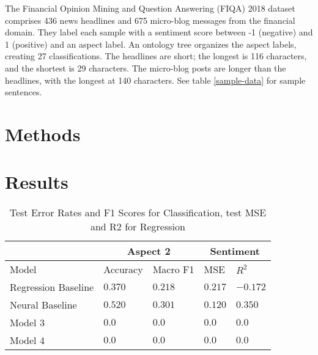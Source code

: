 \documentclass[11pt,a4paper,titlepage]{article}
\begin{document}
The Financial Opinion Mining and Question Answering (FIQA) 2018 dataset \citep{10.1145/3184558.3192301} comprises 436 news headlines and 675 micro-blog messages from the financial domain. They label each sample with a sentiment score between -1 (negative) and 1 (positive) and an aspect label. An ontology tree organizes the aspect labels, creating 27 classifications. The headlines are short; the longest is 116 characters, and the shortest is 29 characters. The micro-blog posts are longer than the headlines, with the longest at 140 characters. See table \ref{sample-data} for sample sentences.

\section{Methods}



\section{Results}

\begin{table*}
  \small
  \caption{Test Error Rates and F1 Scores for Classification, test MSE and R2 for Regression}
  \label{results-table}
  \centering
  \begin{tabular}{lllll}
    \multicolumn{1}{c}{} & \multicolumn{2}{c}{Aspect 2} & \multicolumn{2}{c}{Sentiment}\\
    \hline
    Model                   & Accuracy         & Macro F1         & MSE              & $R^2$ \\ 
    \midrule
    Regression Baseline     & $0.370$          & $0.218$          & $0.217$          & $-0.172$          \\
    Neural Baseline         & $\mathbf{0.520}$ & $\mathbf{0.301}$ & $\mathbf{0.120}$ & $\mathbf{0.350}$  \\
    Model 3                 & $0.0$            & $0.0$            & $0.0$            & $0.0$             \\
    Model 4                 & $0.0$            & $0.0$            & $0.0$            & $0.0$             \\
    \bottomrule
  \end{tabular}
\end{table*}


\end{document}
